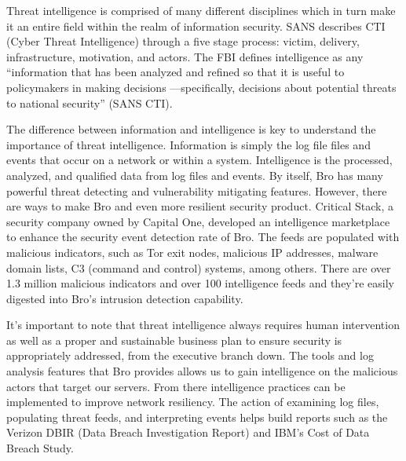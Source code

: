 \documentclass[./main.tex]{subfiles}
\begin{document}
Threat intelligence is comprised of many different disciplines which in turn make it an entire field within the realm of information security. SANS describes CTI (Cyber Threat Intelligence) through a five stage process: victim, delivery, infrastructure, motivation, and actors. The FBI defines intelligence as any “information that has been analyzed and refined so that it is useful to policymakers in making decisions —specifically, decisions about potential threats to national security” (SANS CTI).

The difference between information and intelligence is key to understand the importance of threat intelligence. Information is simply the log file files and events that occur on a network or within a system. Intelligence is the processed, analyzed, and qualified data from log files and events. By itself, Bro has many powerful threat detecting and vulnerability mitigating features. However, there are ways to make Bro and even more resilient security product. Critical Stack, a security company owned by Capital One, developed an intelligence marketplace to enhance the security event detection rate of Bro. The feeds are populated with malicious indicators, such as Tor exit nodes, malicious IP addresses, malware domain lists, C3 (command and control) systems, among others. There are over 1.3 million malicious indicators and over 100 intelligence feeds and they’re easily digested into Bro’s intrusion detection capability.

It’s important to note that threat intelligence always requires human intervention as well as a proper and sustainable business plan to ensure security is appropriately addressed, from the executive branch down. The tools and log analysis features that Bro provides allows us to gain intelligence on the malicious actors that target our servers. From there intelligence practices can be implemented to improve network resiliency. The action of examining log files, populating threat feeds, and interpreting events helps build reports such as the Verizon DBIR (Data Breach Investigation Report) and IBM’s Cost of Data Breach Study.
\end{document}
